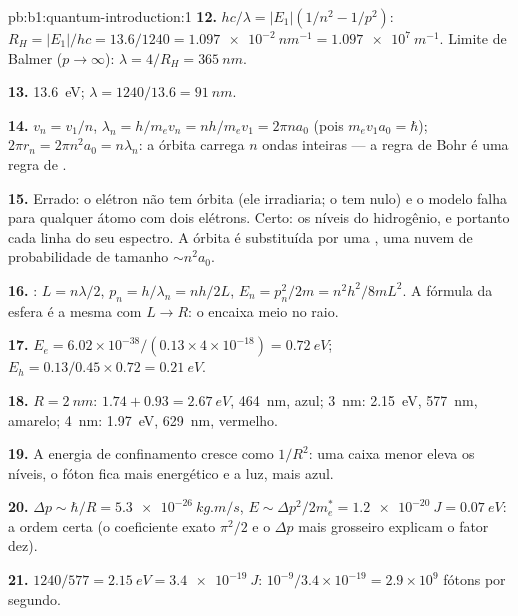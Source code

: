 \begin{solution}{pb:b1:quantum-introduction:1}
\textbf{12.} $hc/\lambda = |E_1|(1/n^2 - 1/p^2)$: $R_H = |E_1|/hc = 13.6/1240 =
\qty{1.097e-2}{nm^{-1}} = \qty{1.097e7}{m^{-1}}$. Limite de Balmer ($p \to \infty$):
$\lambda = 4/R_H = \qty{365}{nm}$.

\textbf{13.} \qty{13.6}{eV}; $\lambda = 1240/13.6 = \qty{91}{nm}$.

\textbf{14.} $v_n = v_1/n$, $\lambda_n = h/m_ev_n = nh/m_ev_1 = 2\pi na_0$ (pois $m_ev_1a_0
= \hbar$); $2\pi r_n = 2\pi n^2a_0 = n\lambda_n$: a órbita carrega $n$ ondas
inteiras --- a regra de Bohr é uma regra de .

\textbf{15.} Errado: o elétron não tem órbita (ele irradiaria; o
 tem  nulo) e o modelo falha para qualquer átomo
com dois elétrons. Certo: os níveis do hidrogênio, e portanto cada linha do seu
espectro. A órbita é substituída por uma , uma nuvem de probabilidade
de tamanho $\sim n^2a_0$.

\textbf{16.} : $L = n\lambda/2$, $p_n = h/\lambda_n = nh/2L$, $E_n =
p_n^2/2m = n^2h^2/8mL^2$. A fórmula da esfera é a mesma com $L \to R$:
o  encaixa meio  no raio.

\textbf{17.} $E_e = 6.02 \times 10^{-38}/(0.13 \times 4 \times 10^{-18}) = \qty{0.72}{eV}$;
$E_h = 0.13/0.45 \times 0.72 = \qty{0.21}{eV}$.

\textbf{18.} $R = \qty{2}{nm}$: $1.74 + 0.93 = \qty{2.67}{eV}$, \qty{464}{nm}, azul;
\qty{3}{nm}: \qty{2.15}{eV}, \qty{577}{nm}, amarelo; \qty{4}{nm}: \qty{1.97}{eV},
\qty{629}{nm}, vermelho.

\textbf{19.} A energia de confinamento cresce como $1/R^2$: uma caixa menor eleva
os níveis, o fóton fica mais energético e a luz, mais azul.

\textbf{20.} $\Delta p \sim \hbar/R = \qty{5.3e-26}{kg.m/s}$, $E \sim \Delta p^2/2m_e^\ast =
\qty{1.2e-20}{J} = \qty{0.07}{eV}$: a ordem certa (o coeficiente exato
$\pi^2/2$ e o $\Delta p$ mais grosseiro explicam o fator dez).

\textbf{21.} $1240/577 = \qty{2.15}{eV} = \qty{3.4e-19}{J}$: $10^{-9}/3.4 \times 10^{-19}
= 2.9 \times 10^9$ fótons por segundo.


\end{solution}
